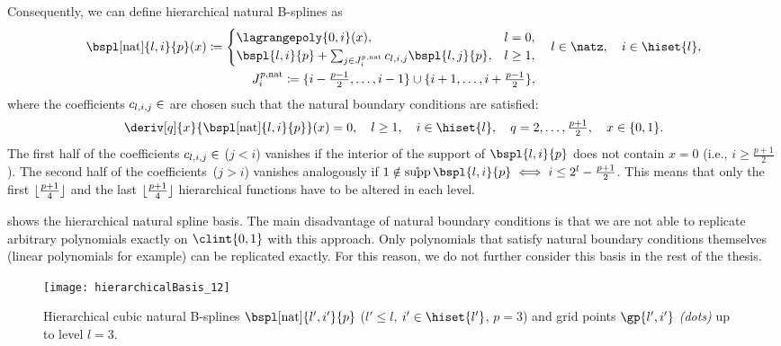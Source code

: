 Consequently, we can define hierarchical natural B-splines as
\begin{subequations}
  \begin{gather}
    \bspl[\ntrl]{l,i}{p}(x)
    \ceq
    \begin{cases}
      \lagrangepoly{0,i}(x),&
      l = 0,\\
      \bspl{l,i}{p} +
      \sum_{j \in J_i^{p,\ntrl}} c_{l,i,j} \bspl{l,j}{p},&
      l \ge 1,
    \end{cases}\quad
    l \in \natz,\quad
    i \in \hiset{l},\\
    J_i^{p,\ntrl}
    \ceq \{i-\tfrac{p-1}{2}, \dotsc, i-1\} \cup
    \{i+1, \dotsc, i+\tfrac{p-1}{2}\},
  \end{gather}
\end{subequations}
where the coefficients $c_{l,i,j} \in \real$ are chosen such that
the natural boundary conditions are satisfied:
\begin{equation}
  \deriv[q]{x}{\bspl[\ntrl]{l,i}{p}}(x)
  = 0,\quad
  l \ge 1,\quad
  i \in \hiset{l},\quad
  q = 2, \dotsc, \tfrac{p+1}{2},\quad
  x \in \{0, 1\}.
\end{equation}
The first half of the coefficients $c_{l,i,j} \in \real$
($j < i$) vanishes if the interior of the support of $\bspl{l,i}{p}$
does not contain $x = 0$
(i.e., $i \ge \tfrac{p+1}{2}$).
The second half of the coefficients~($j > i$) vanishes analogously
if $1 \notin \interiorsupp \bspl{l,i}{p} \iff i \le 2^l - \tfrac{p+1}{2}$.
This means that
only the first $\lfloor\tfrac{p+1}{4}\rfloor$ and the last $\lfloor\tfrac{p+1}{4}\rfloor$
hierarchical functions have to be altered in each level.

 shows the hierarchical natural spline basis.
The main disadvantage of natural boundary conditions is that
we are not able to replicate arbitrary polynomials exactly on $\clint{0, 1}$
with this approach.
Only polynomials that satisfy natural boundary conditions themselves
(linear polynomials for example)
can be replicated exactly.
For this reason, we do not further consider this basis in the
rest of the thesis.

\begin{SCfigure}
  \texttt{[image: hierarchicalBasis\_12]}%
  \caption[%
    Hierarchical natural B-splines%
  ]{%
    Hierarchical cubic natural B-splines
    \vspace{-0.1em}%
    $\bspl[\ntrl]{l',i'}{p}$
    ($l' \le l$, $i' \in \hiset{l'}$, $p = 3$) and
    \vspace{0.05em}%
    grid points $\gp{l',i'}$ \emph{(dots)} up to level $l = 3$.%
  }%
  \label{fig:naturalBSpline}%
\end{SCfigure}
